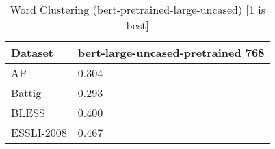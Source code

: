 \begin{table}[]
\centering
\begin{tabular}{l|l}
\hline
Dataset & bert-large-uncased-pretrained 768 \\
\hline
AP & 0.304 \\ 
Battig & 0.293 \\ 
BLESS & 0.400 \\ 
ESSLI-2008 & 0.467
\end{tabular}
\caption{Word Clustering (bert-pretrained-large-uncased) [1 is best]}
\label{tab:cluster-bert-pretrained-large-uncased}
\end{table}
